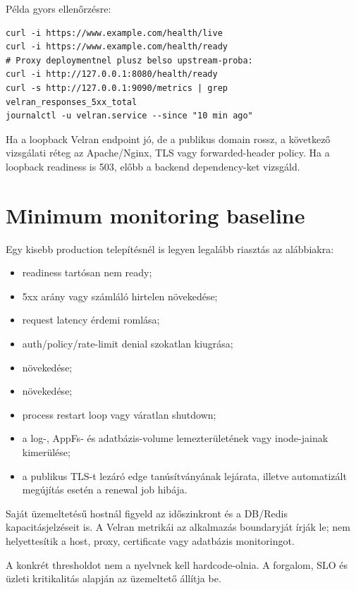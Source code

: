 Példa gyors ellenőrzésre:

\begin{lstlisting}
curl -i https://www.example.com/health/live
curl -i https://www.example.com/health/ready
# Proxy deploymentnel plusz belso upstream-proba:
curl -i http://127.0.0.1:8080/health/ready
curl -s http://127.0.0.1:9090/metrics | grep velran_responses_5xx_total
journalctl -u velran.service --since "10 min ago"
\end{lstlisting}

Ha a loopback Velran endpoint jó, de a publikus domain rossz, a következő vizsgálati réteg az Apache/Nginx, TLS vagy forwarded-header policy. Ha a loopback readiness is 503, előbb a backend dependency-ket vizsgáld.

\section{Minimum monitoring baseline}

Egy kisebb production telepítésnél is legyen legalább riasztás az alábbiakra:

\begin{itemize}
  \item readiness tartósan nem ready;
  \item 5xx arány vagy számláló hirtelen növekedése;
  \item request latency érdemi romlása;
  \item auth/policy/rate-limit denial szokatlan kiugrása;
  \item {} növekedése;
  \item {} növekedése;
  \item process restart loop vagy váratlan shutdown;
  \item a log-, AppFs- és adatbázis-volume lemezterületének vagy inode-jainak kimerülése;
  \item a publikus TLS-t lezáró edge tanúsítványának lejárata, illetve automatizált megújítás esetén a renewal job hibája.
\end{itemize}

Saját üzemeltetésű hostnál figyeld az időszinkront és a DB/Redis kapacitásjelzéseit is. A Velran metrikái az alkalmazás boundaryját írják le; nem helyettesítik a host, proxy, certificate vagy adatbázis monitoringot.

A konkrét thresholdot nem a nyelvnek kell hardcode-olnia. A forgalom, SLO és üzleti kritikalitás alapján az üzemeltető állítja be.

